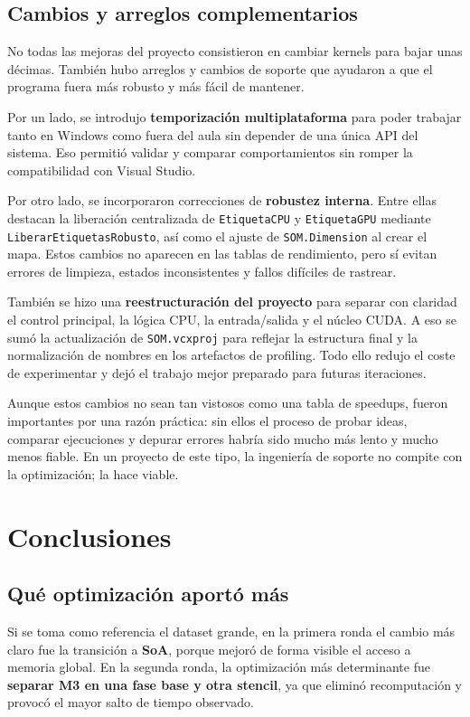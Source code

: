\documentclass[11pt,a4paper]{article}
\begin{document}
\subsection{Cambios y arreglos complementarios}

No todas las mejoras del proyecto consistieron en cambiar kernels para bajar unas décimas. También hubo arreglos y cambios de soporte que ayudaron a que el programa fuera más robusto y más fácil de mantener.

Por un lado, se introdujo \textbf{temporización multiplataforma} para poder trabajar tanto en Windows como fuera del aula sin depender de una única API del sistema. Eso permitió validar y comparar comportamientos sin romper la compatibilidad con Visual Studio.

Por otro lado, se incorporaron correcciones de \textbf{robustez interna}. Entre ellas destacan la liberación centralizada de \texttt{EtiquetaCPU} y \texttt{EtiquetaGPU} mediante \texttt{LiberarEtiquetasRobusto}, así como el ajuste de \texttt{SOM.Dimension} al crear el mapa. Estos cambios no aparecen en las tablas de rendimiento, pero sí evitan errores de limpieza, estados inconsistentes y fallos difíciles de rastrear.

También se hizo una \textbf{reestructuración del proyecto} para separar con claridad el control principal, la lógica CPU, la entrada/salida y el núcleo CUDA. A eso se sumó la actualización de \texttt{SOM.vcxproj} para reflejar la estructura final y la normalización de nombres en los artefactos de profiling. Todo ello redujo el coste de experimentar y dejó el trabajo mejor preparado para futuras iteraciones.

Aunque estos cambios no sean tan vistosos como una tabla de speedups, fueron importantes por una razón práctica: sin ellos el proceso de probar ideas, comparar ejecuciones y depurar errores habría sido mucho más lento y mucho menos fiable. En un proyecto de este tipo, la ingeniería de soporte no compite con la optimización; la hace viable.

\section{Conclusiones}

\subsection{Qué optimización aportó más}

Si se toma como referencia el dataset grande, en la primera ronda el cambio más claro fue la transición a \textbf{SoA}, porque mejoró de forma visible el acceso a memoria global. En la segunda ronda, la optimización más determinante fue \textbf{separar M3 en una fase base y otra stencil}, ya que eliminó recomputación y provocó el mayor salto de tiempo observado.
\end{document}
